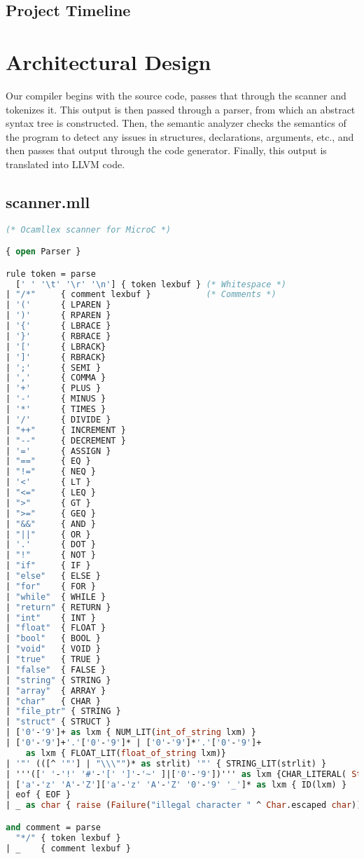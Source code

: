 \documentclass{article}
\begin{document}
\subsection{Project Timeline}

\newpage
\section{Architectural Design}
Our compiler begins with the source code, passes that through the scanner and tokenizes it. This output is then passed through a parser, from which an abstract syntax tree is constructed. Then, the semantic analyzer checks the semantics of the program to detect any issues in structures, declarations, arguments, etc., and then passes that output through the code generator. Finally, this output is translated into LLVM code.
\subsection{scanner.mll}
\begin{lstlisting}[language=Caml]
(* Ocamllex scanner for MicroC *)

{ open Parser }

rule token = parse
  [' ' '\t' '\r' '\n'] { token lexbuf } (* Whitespace *)
| "/*"     { comment lexbuf }           (* Comments *)
| '('      { LPAREN }
| ')'      { RPAREN }
| '{'      { LBRACE }
| '}'      { RBRACE }
| '['      { LBRACK}
| ']'      { RBRACK}
| ';'      { SEMI }
| ','      { COMMA }
| '+'      { PLUS }
| '-'      { MINUS }
| '*'      { TIMES }
| '/'      { DIVIDE }
| "++"     { INCREMENT }
| "--"     { DECREMENT }
| '='      { ASSIGN }
| "=="     { EQ }
| "!="     { NEQ }
| '<'      { LT }
| "<="     { LEQ }
| ">"      { GT }
| ">="     { GEQ }
| "&&"     { AND }
| "||"     { OR }
| '.'      { DOT }
| "!"      { NOT }
| "if"     { IF }
| "else"   { ELSE }
| "for"    { FOR }
| "while"  { WHILE }
| "return" { RETURN }
| "int"    { INT }
| "float"  { FLOAT }
| "bool"   { BOOL }
| "void"   { VOID }
| "true"   { TRUE }
| "false"  { FALSE }
| "string" { STRING }
| "array"  { ARRAY }
| "char"   { CHAR }
| "file_ptr" { STRING }
| "struct" { STRUCT }
| ['0'-'9']+ as lxm { NUM_LIT(int_of_string lxm) }
| ['0'-'9']+'.'['0'-'9']* | ['0'-'9']*'.'['0'-'9']+ 
	as lxm { FLOAT_LIT(float_of_string lxm)}
| '"' (([^ '"'] | "\\\"")* as strlit) '"' { STRING_LIT(strlit) } 
| '''([' '-'!' '#'-'[' ']'-'~' ]|['0'-'9'])''' as lxm {CHAR_LITERAL( String.get lxm 1)}
| ['a'-'z' 'A'-'Z']['a'-'z' 'A'-'Z' '0'-'9' '_']* as lxm { ID(lxm) }
| eof { EOF }
| _ as char { raise (Failure("illegal character " ^ Char.escaped char)) }

and comment = parse
  "*/" { token lexbuf }
| _    { comment lexbuf }
\end{lstlisting}
\end{document}

